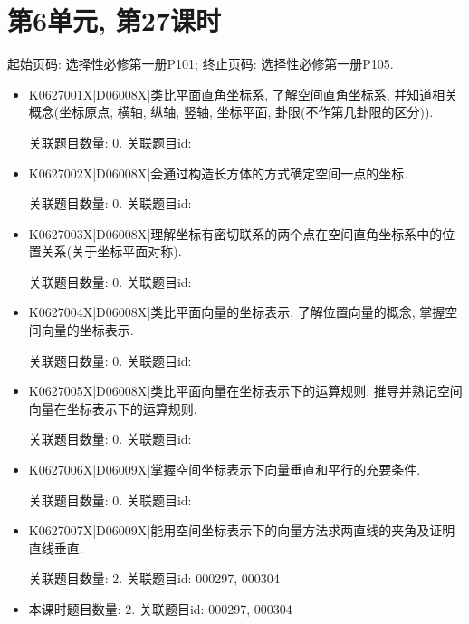 \section*{第6单元, 第27课时}
起始页码: 选择性必修第一册P101; 终止页码: 选择性必修第一册P105.
\begin{itemize}
\item K0627001X|D06008X|类比平面直角坐标系, 了解空间直角坐标系, 并知道相关概念(坐标原点, 横轴, 纵轴, 竖轴, 坐标平面, 卦限(不作第几卦限的区分)).

关联题目数量: 0. 关联题目id: 

\item K0627002X|D06008X|会通过构造长方体的方式确定空间一点的坐标.

关联题目数量: 0. 关联题目id: 

\item K0627003X|D06008X|理解坐标有密切联系的两个点在空间直角坐标系中的位置关系(关于坐标平面对称).

关联题目数量: 0. 关联题目id: 

\item K0627004X|D06008X|类比平面向量的坐标表示, 了解位置向量的概念, 掌握空间向量的坐标表示.

关联题目数量: 0. 关联题目id: 

\item K0627005X|D06008X|类比平面向量在坐标表示下的运算规则, 推导并熟记空间向量在坐标表示下的运算规则.

关联题目数量: 0. 关联题目id: 

\item K0627006X|D06009X|掌握空间坐标表示下向量垂直和平行的充要条件.

关联题目数量: 0. 关联题目id: 

\item K0627007X|D06009X|能用空间坐标表示下的向量方法求两直线的夹角及证明直线垂直.

关联题目数量: 2. 关联题目id: 000297, 000304

\item 本课时题目数量: 2. 关联题目id: 000297, 000304

\end{itemize}

